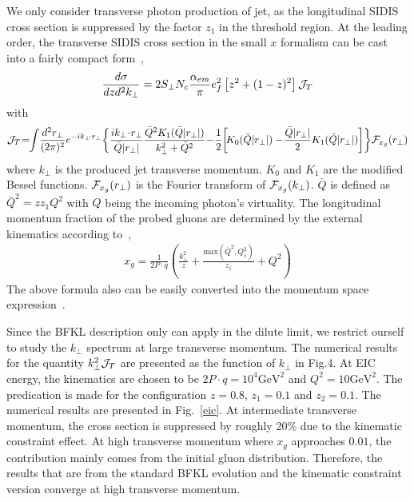 \documentclass[prd,aps,preprint,tightenlines,nofootinbib,superscriptaddress]{revtex4}
\begin{document}
We only consider transverse photon production of jet,   as the longitudinal SIDIS cross section is suppressed by the factor $z_1$ in the threshold region. At the leading order, the transverse SIDIS cross section in the small $x$ formalism can be cast into a fairly compact form~\cite{Iancu:2020jch}, 
\begin{eqnarray}
\frac{d \sigma}{dz d^2 k_\perp}=2S_\perp N_c \frac{\alpha_{em}}{\pi} e_f^2\left [ z^2+(1-z)^2\right]
{\cal J}_T
\end{eqnarray}
with
\begin{eqnarray}
{\cal J}_T\!=\!\!
\int \! \frac{d^2r_\perp}{(2\pi)^2} e^{-i k_\perp \!\cdot r_\perp}\!
  \left \{ \frac{i k_\perp\! \cdot\!   r_\perp }{\bar Q |r_\perp| }  \frac{\bar Q^2K_1(\bar Q |r_\perp|)}{k_\perp^2+\bar Q^2} \!-\!\frac{1}{2} \!\left[\!  K_0(\bar Q |r_\perp|)-\!\frac{\bar Q |r_\perp|}{2
}K_1(\bar Q |r_\perp|)\right ] \right \}\! {\cal F}_{x_g}(r_\perp)
\end{eqnarray}
where $k_\perp$ is the produced jet transverse momentum. $K_0$ and $K_1$ are the modified Bessel functions. ${\cal F}_{x_g}(r_\perp)$ is the Fourier transform of ${\cal F}_{x_g}(k_\perp)$. $\bar Q$ is defined as $\bar Q^2=zz_1Q^2$ with $Q$ being the incoming photon's virtuality. The longitudinal momentum fraction of the probed gluons are determined by the external kinematics according to~\cite{Iancu:2020jch},
\begin{eqnarray}
x_g=\frac{1}{2 P\cdot q} \left (  \frac{k_\perp^2}{z}+ \frac{\text{max} (\bar Q^2, Q_s^2)}{z_1}+Q^2\right ) 
\end{eqnarray}
The above formula also can be easily converted into the momentum space expression~\cite{Dong:2018wsp}.

Since the BFKL description  only can apply in the dilute limit, we restrict ourself to study the $k_\perp$ spectrum at large transverse momentum. The numerical results for the quantity $k_\perp^2 {\cal J}_T$ are presented as the function of $k_\perp$ in Fig.4.  At EIC energy, the kinematics are chosen to be $2 P\cdot q=10^4 \text{GeV}^2$ and $Q^2=10 \text{GeV}^2$.  The predication is made for the configuration  $z=0.8$, $z_1=0.1$ and $z_2=0.1$.
The numerical results are presented in Fig.~\ref{eic}. At  intermediate transverse momentum, the cross section is suppressed by roughly 20\%  due to the kinematic constraint effect. At high transverse momentum  where $x_g$ approaches $0.01$, the contribution  mainly comes from the initial gluon  distribution. Therefore, the results that are from the standard BFKL evolution and the kinematic constraint version converge  at high transverse momentum. 
\end{document}
